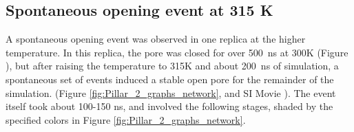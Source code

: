 \documentclass[9pt,twocolumn,twoside,lineno]{pnas-new}
\begin{document}

\subsection*{Spontaneous opening event at 315 K}
A spontaneous opening event was observed in one \WT replica at the higher temperature.  In this replica, the pore was closed for over 500~ns at 300K (Figure \SklowTrepTwo), but after raising the temperature to 315K and about 200~ns of simulation, a spontaneous set of events induced a stable open pore for the remainder of the simulation.  (Figure \ref{fig:Pillar_2_graphs_network}, and SI Movie \SkMovie).   The event itself took about 100-150 ns, and involved the following stages, shaded by the specified colors in Figure \ref{fig:Pillar_2_graphs_network}.
\end{document}
